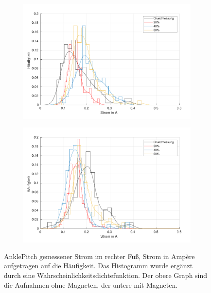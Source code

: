 \begin{figure}[tb]
	\centering
		\begin{subfigure}[c]{.9\linewidth}
			\centering
			\includegraphics[width=\linewidth]{Bilder/rechts_Current_AnklePitch_ohneM.pdf}
			\vspace{5pt}
		\end{subfigure}
		\hfill
		\begin{subfigure}[c]{.9\linewidth}
			\centering
			\includegraphics[width=\linewidth]{Bilder/rechts_Current_AnklePitch_mitM.pdf}
			\vspace{5pt}
		\end{subfigure}
	\caption{AnklePitch gemessener Strom im rechter Fuß, Strom in Ampère aufgetragen auf die Häufigkeit. Das Histogramm wurde ergänzt durch eine Wahrscheinlichkeitsdichtefunktion. Der obere Graph sind die Aufnahmen ohne Magneten, der untere mit Magneten.} \label{AnklePitch_Current_rechts}
\end{figure}

